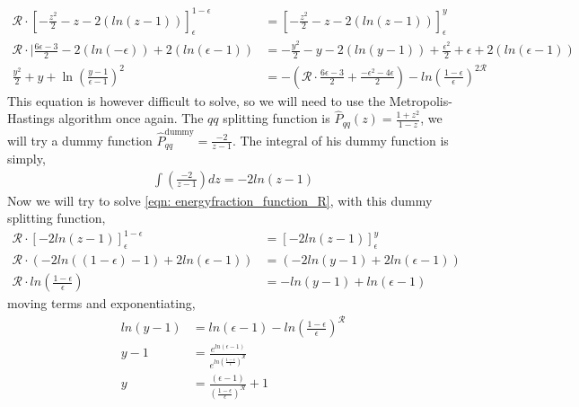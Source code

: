 \documentclass[main.tex]{subfiles}
\begin{document}
\begin{align}
    \mathcal{R} \cdot \left[-\frac{z^2}{2} - z - 2\left( ln(z-1)\right) \right]_\epsilon^{1-\epsilon} &= \left[-\frac{z^2}{2} - z - 2\left( ln(z-1)\right) \right]_\epsilon^{y} \nonumber \\
    \mathcal{R}\cdot|  \frac{6 \epsilon-3}{2} - 2 ( ln(-\epsilon)) + 2 ( ln(\epsilon-1)) &= -\frac{y^2}{2} - y - 2 ( ln(y-1)) +\frac{\epsilon^2}{2} + \epsilon + 2 ( ln(\epsilon-1)) \nonumber\\
    \frac{y^2}{2} + y + \ln \left( \frac{y-1}{\epsilon-1}\right)^2  &= -\left(\mathcal{R} \cdot \frac{6 \epsilon-3}{2} + \frac{-\epsilon^2-4 \epsilon}{2}\right) - ln\left(\frac{1-\epsilon}{\epsilon}\right)^{2\mathcal{R}}
\end{align}
This equation is however difficult to solve, so we will need to use the Metropolis-Hastings algorithm once again. The \(qq\) splitting function is \(\hat{P}_{qq}(z) = \frac{1+z^2}{1-z}\), we will try a dummy function \(\hat{P}_{qq}^{\text{dummy}} = \frac{-2}{z-1}\). The integral of his dummy function is simply,
\begin{align}
    \int(\frac{-2}{z-1})dz = -2 ln(z-1)
\end{align}
Now we will try to solve \autoref{eqn: energyfraction_function_R}, with this dummy splitting function, 
\begin{align}
    \mathcal{R}\cdot \left[-2 ln(z-1)\right]_{\epsilon}^{1-\epsilon} &= \left[-2 ln(z-1)\right]_{\epsilon}^{y} \nonumber \\
    \mathcal{R}\cdot \left(-2 ln((1-\epsilon)-1) + 2 ln(\epsilon-1) \right) &= \left(-2 ln(y-1) + 2 ln(\epsilon-1) \right) \nonumber \\
    \mathcal{R}\cdot ln\left(\frac{1-\epsilon}{\epsilon} \right) &= - ln(y-1) + ln(\epsilon-1)
\end{align}
moving terms and exponentiating, 
\begin{align}
    ln(y-1) &= ln(\epsilon-1) - ln\left(\frac{1-\epsilon}{\epsilon} \right)^{\mathcal{R}} \nonumber \\
    y-1 &= \frac{e^{ln(\epsilon-1)}}{e^{ln(\frac{1-\epsilon}{\epsilon})^{\mathcal{R}}}} \nonumber \\
    y &= \frac{(\epsilon-1)}{(\frac{1-\epsilon}{\epsilon})^{\mathcal{R}}} +1 
\end{align}
\end{document}
